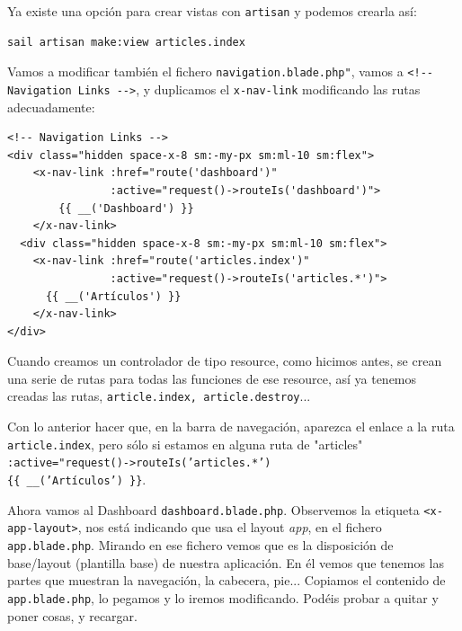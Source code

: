 \documentclass[11pt]{article}
\begin{document}
Ya existe una opción para crear vistas con \texttt{artisan} y podemos crearla así:
\begin{verbatim}
sail artisan make:view articles.index
\end{verbatim}


Vamos a modificar también el fichero \texttt{navigation.blade.php"}, vamos a
\texttt{<!-{}-{} Navigation Links -{}-{}>}, y duplicamos el \texttt{x-nav-link} modificando
las rutas adecuadamente:

\begin{verbatim}
<!-- Navigation Links -->
<div class="hidden space-x-8 sm:-my-px sm:ml-10 sm:flex">
    <x-nav-link :href="route('dashboard')"
                :active="request()->routeIs('dashboard')">
        {{ __('Dashboard') }}
    </x-nav-link>
  <div class="hidden space-x-8 sm:-my-px sm:ml-10 sm:flex">
    <x-nav-link :href="route('articles.index')"
                :active="request()->routeIs('articles.*')">
      {{ __('Artículos') }}
    </x-nav-link>
</div>
\end{verbatim}

Cuando creamos un controlador de tipo resource, como hicimos antes, se
crean una serie de rutas para todas las funciones de ese resource, así
ya tenemos creadas las rutas, \texttt{article.index, article.destroy}...

Con lo anterior hacer que, en la barra de navegación, aparezca el
enlace a la ruta \texttt{article.index}, pero sólo si estamos en alguna ruta
de "articles" \texttt{:active="request()->routeIs('articles.*')} \\[0pt]
\texttt{\{\{ \_\_('Artículos') \}\}}.

Ahora vamos al Dashboard \texttt{dashboard.blade.php}. Observemos la etiqueta
\texttt{<x-app-layout>}, nos está indicando que usa el layout \emph{app}, en el
fichero \texttt{app.blade.php}. Mirando en ese fichero vemos que es la
disposición de base/layout (plantilla base) de nuestra aplicación. En
él vemos que tenemos las partes que muestran la navegación, la
cabecera, pie... Copiamos el contenido de \texttt{app.blade.php}, lo pegamos
y lo iremos modificando. Podéis probar a quitar y poner cosas, y recargar.
\end{document}
